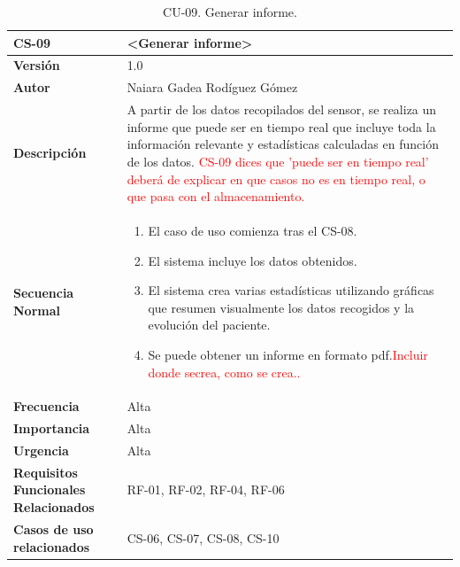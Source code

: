 
\begin{table}[h!]
\centering
\begin{tabular}{ |m{3cm}|m{11cm}|  } 
\hline
\cellcolor[HTML]{B9E3F0}\textbf{CS-09} & \cellcolor[HTML]{B9E3F0}\textbf{<Generar informe>}\\

\hline
\cellcolor[HTML]{EFEFEF}\textbf{Versión}             & 1.0  \\
\hline
\cellcolor[HTML]{EFEFEF}\textbf{Autor}                & Naiara Gadea Rodíguez Gómez\\
\hline
\cellcolor[HTML]{EFEFEF}\textbf{Descripción}                & {A partir de los datos recopilados del sensor, se realiza un informe que puede ser en tiempo real que incluye toda la información relevante y estadísticas calculadas en función de los datos. \textcolor{red}{CS-09 dices que 'puede ser en tiempo real' deberá de explicar en que casos no es en tiempo real, o que pasa con el almacenamiento.} }\\
\hline
\cellcolor[HTML]{EFEFEF}\textbf{Secuencia \newline Normal}                &                 
        \begin{enumerate}
			\def\labelenumi{\arabic{enumi}.}
			\tightlist
			\item El caso de uso comienza tras el CS-08.
			\item El sistema incluye los datos obtenidos. 
                \item El sistema crea varias estadísticas utilizando gráficas que resumen visualmente los datos recogidos y la evolución del paciente.
                \item Se puede obtener un informe en formato pdf.\textcolor{red}{Incluir donde secrea, como se crea..} 
		\end{enumerate}\\
\hline
\cellcolor[HTML]{EFEFEF}\textbf{Frecuencia}                & Alta\\
\hline
\cellcolor[HTML]{EFEFEF}\textbf{Importancia}                & Alta\\
\hline
\cellcolor[HTML]{EFEFEF}\textbf{Urgencia}                & Alta\\
\hline
\cellcolor[HTML]{EFEFEF}\textbf{Requisitos Funcionales Relacionados}                & {RF-01, RF-02, RF-04, RF-06 }\\
\hline
\cellcolor[HTML]{EFEFEF}\textbf{Casos de uso relacionados}                & {CS-06, CS-07, CS-08, CS-10 }\\
\hline
\end{tabular}
\caption{CU-09. Generar informe.}
\end{table}

